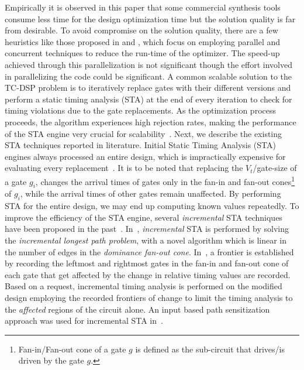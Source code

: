  Empirically it is observed in this paper that some commercial synthesis tools consume less time for the design optimization time but the solution quality is far from desirable. To avoid compromise on the solution quality, there are a few heuristics like those proposed in \cite{wu:08} and \cite{hu:12}, which focus on employing parallel and concurrent techniques to reduce the run-time of the optimizer. The speed-up achieved through this parallelization is not significant though the effort involved in parallelizing the code could be significant. A common scalable solution to the TC-DSP problem is to iteratively replace gates with their different  versions and perform a static timing analysis (STA) at the end of every iteration to check for timing violations due to the gate replacements.
 As the optimization process proceeds, the algorithm experiences high rejection rates, making the performance of the STA 
engine very crucial for scalability~\cite{papa:10}. Next, we describe the existing STA techniques reported
in literature. 
%
Initial Static Timing Analysis (STA) engines always processed an entire design, which is impractically expensive for evaluating every 
replacement~\cite{papa:10}. It is to be noted that replacing the $V_t$/gate-size of a gate $g_i$, changes the arrival times of gates only in the fan-in and fan-out cones\footnote{Fan-in/Fan-out cone of a gate $g$ is defined as the sub-circuit that drives/is driven by the gate $g$.} of $g_i$, while the arrival times of other gates remain unaffected. By performing STA for the entire design, we may end up computing known values repeatedly. 
To improve the efficiency of the STA engine, several {\em incremental} STA techniques have been proposed in the past~\cite{lee:95,abato:96,sapatnekar:96,mondal:04,das:06,papa:08}. In~\cite{lee:95}, {\em incremental} STA is performed by solving 
the {\em incremental longest path problem}, with a novel algorithm which is linear in the number of edges in the {\em dominance fan-out cone}. In~\cite{abato:96}, a frontier is established by recording the leftmost and rightmost gates in the fan-in and fan-out cone of each gate that get affected by the change in relative timing values are recorded.
Based on a request, incremental timing analysis is performed on the modified design
employing the recorded frontiers of change to limit the timing analysis to 
the {\em affected} regions of the circuit alone. An input based path sensitization approach 
was used for incremental STA in~\cite{sapatnekar:96}.
